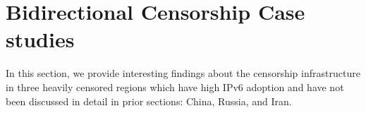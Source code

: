 \section{Bidirectional Censorship Case studies}
\label{sec:cases}
In this section, we provide interesting findings about the censorship
infrastructure in three heavily censored regions which have high IPv6 adoption
and have not been discussed in detail in prior sections: China, Russia, and
Iran.





